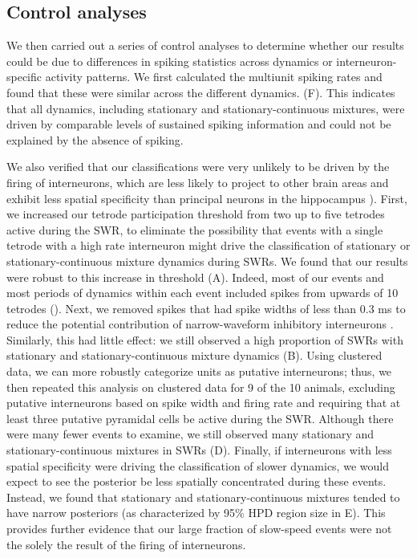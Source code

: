 \documentclass[9pt,lineno]{elife}
\begin{document}
\subsection*{Control analyses}

We then carried out a series of control analyses to determine whether our results could be due to differences in spiking statistics across dynamics or interneuron-specific activity patterns. We first calculated the multiunit spiking rates and found that these were similar across the different dynamics. (F). This indicates that all dynamics, including stationary and stationary-continuous mixtures, were driven by comparable levels of sustained spiking information and could not be explained by the absence of spiking.

We also verified that our classifications were very unlikely to be driven by the firing of interneurons, which are less likely to project to other brain areas and exhibit less spatial specificity than principal neurons in the hippocampus \citep{HangyaComplementaryspatialfiring2010, WilentDiscretePlaceFields2007, JinnoNeuronalDiversityGABAergic2007}). First, we increased our tetrode participation threshold from two up to five tetrodes active during the SWR, to eliminate the possibility that events with a single tetrode with a high rate interneuron might drive the classification of stationary or stationary-continuous mixture dynamics during SWRs. We found that our results were robust to this increase in threshold (A). Indeed, most of our events and most periods of dynamics within each event included spikes from upwards of 10 tetrodes (). Next, we removed spikes that had spike widths of less than 0.3 ms to reduce the potential contribution of narrow-waveform inhibitory interneurons \citep{FoxLocalizationanatomicalidentification1975}. Similarly, this had little effect: we still observed a high proportion of SWRs with stationary and stationary-continuous mixture dynamics (B). Using clustered data, we can more robustly categorize units as putative interneurons; thus, we then repeated this analysis on clustered data for 9 of the 10 animals, excluding putative interneurons based on spike width and firing rate and requiring that at least three putative pyramidal cells be active during the SWR. Although there were many fewer events to examine, we still observed many stationary and stationary-continuous mixtures in SWRs (D). Finally, if interneurons with less spatial specificity were driving the classification of slower dynamics, we would expect to see the posterior be less spatially concentrated during these events. Instead, we found that stationary and stationary-continuous mixtures tended to have narrow posteriors (as characterized by 95\% HPD region size in E). This provides further evidence that our large fraction of slow-speed events were not the solely the result of the firing of interneurons. 
\end{document}

